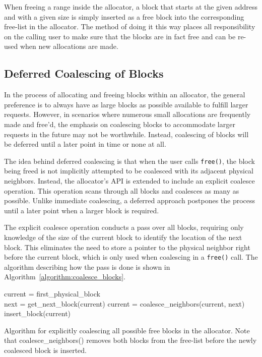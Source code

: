 When freeing a range inside the allocator, a block that starts at the given address and with a given size is simply inserted as a free block into the corresponding free-list in the allocator. The method of doing it this way places all responsibility on the calling user to make sure that the blocks are in fact free and can be re-used when new allocations are made.

\subsection{Deferred Coalescing of Blocks}

In the process of allocating and freeing blocks within an allocator, the general preference is to always have as large blocks as possible available to fulfill larger requests. However, in scenarios where numerous small allocations are frequently made and free'd, the emphasis on coalescing blocks to accommodate larger requests in the future may not be worthwhile. Instead, coalescing of blocks will be deferred until a later point in time or none at all.

The idea behind deferred coalescing is that when the user calls \texttt{free()}, the block being freed is not implicitly attempted to be coalesced with its adjacent physical neighbors. Instead, the allocator's API is extended to include an explicit coalesce operation. This operation scans through all blocks and coalesces as many as possible. Unlike immediate coalescing, a deferred approach postpones the process until a later point when a larger block is required.

The explicit coalesce operation conducts a pass over all blocks, requiring only knowledge of the size of the current block to identify the location of the next block. This eliminates the need to store a pointer to the physical neighbor right before the current block, which is only used when coalescing in a \texttt{free()} call. The algorithm describing how the pass is done is shown in Algorithm~\ref{algorithm:coalesce_blocks}.

\begin{algorithm}[H]
current = first\_physical\_block\\
 {
next = get\_next\_block(current)\;
 {
    current = coalesce\_neighbors(current, next)\;
    insert\_block(current)\;
}
}
\label{algorithm:coalesce_blocks}
\caption{Algorithm for explicitly coalescing all possible free blocks in the allocator. Note that coalesce\_neighbors() removes both blocks from the free-list before the newly coalesced block is inserted.}
\end{algorithm}

